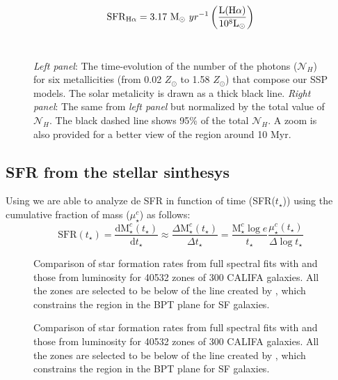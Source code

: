 \documentclass[a4paper,11pt]{article}
\begin{document}
\begin{equation}
	\mathrm{SFR}_{\Halpha} = 3.17\ \mathrm{M}_\odot\ yr^{-1} \left(\frac{\mathrm{L}(\Halpha)}{10^8\mathrm{L}_\odot}\right)
\end{equation}
\
\begin{figure*}
\caption{\emph{Left panel}: The time-evolution of the number of the photons ($\mathcal{N}_H$) for six metallicities (from 0.02 $Z_\odot$ to 1.58 $Z_\odot$) that compose our SSP models. The solar metalicity is drawn as a thick black line. \emph{Right panel}: The same from \emph{left panel} but normalized by the total value of $\mathcal{N}_H$. The black dashed line shows 95\% of the total $\mathcal{N}_H$. A zoom is also provided for a better view of the region around 10 Myr.}
\label{fig:Nh_qh}
\end{figure*}

\subsection{SFR from the stellar sinthesys}
\label{sub:StellarSFR}
Using \STARLIGHT we are able to analyze de SFR in function of time (SFR($t_\star$)) using the cumulative fraction of mass ($\mu_\star^c$) as follows:
\begin{equation}
	\mathrm{SFR}(t_\star) = \frac{\mathrm{d} \mathrm{M}_\star^c(t_\star)}{\mathrm{d} t_\star} \approx \frac{\Delta \mathrm{M}_\star^c(t_\star)}{\Delta t_\star} = \frac{\mathrm{M}_\star^c \log e}{t_\star} \frac{\mu_\star^c(t_\star)}{\Delta \log t_\star}
\end{equation}

\begin{figure*}
\caption{Comparison of star formation rates from full spectral fits with \starlight and those from \Halpha luminosity for 40532 zones of 300 CALIFA galaxies. All the zones are selected to be below of the line created by \citet{Stasinska.2006a}, which constrains the region in the BPT plane for SF galaxies.}
\label{fig:SFHCompare}
\end{figure*}

\begin{figure*}
\caption{Comparison of star formation rates from full spectral fits with \starlight and those from \Halpha luminosity for 40532 zones of 300 CALIFA galaxies. All the zones are selected to be below of the line created by \citet[S06]{Stasinska.2006a}, which constrains the region in the BPT plane for SF galaxies.}
\label{fig:SigmaSFHCompare}
\end{figure*}
\end{document}
